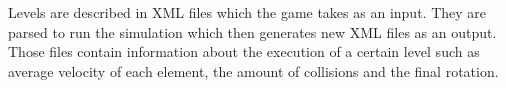 Levels are described in XML files which the game takes as an input. They are parsed to run the simulation which then generates new XML files as an output. Those files contain information about the execution of a certain level such as average velocity of each element, the amount of collisions and the final rotation. 

